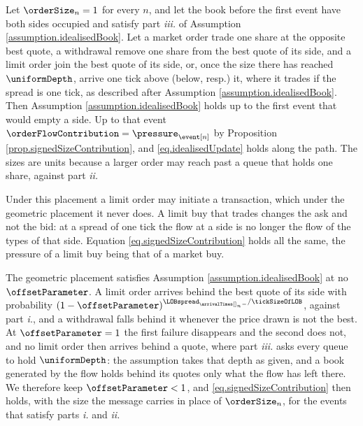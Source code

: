 \begin{example}
\label{example.idealisedPlacement}
 Let $\orderSize_n = 1$ for every $n$,
 and let the book before the first event have both sides occupied and satisfy part
 \emph{iii.} of Assumption \ref{assumption.idealisedBook}.
 Let a market order trade one share at the opposite best quote,
 a withdrawal remove one share from the best quote of its side,
 and a limit order join the best quote of its side,
 or, once the size there has reached $\uniformDepth$,
 arrive one tick above (below, resp.) it,
 where it trades if the spread is one tick,
 as described after Assumption \ref{assumption.idealisedBook}.
 Then Assumption \ref{assumption.idealisedBook} holds
 up to the first event that would empty a side.
 Up to that event $\orderFlowContribution = \pressure_{\event[n]}$
 by Proposition \ref{prop.signedSizeContribution},
 and \eqref{eq.idealisedUpdate} holds along the path.
 The sizes are units because a larger order may reach past a queue that holds one share,
 against part \emph{ii.}
\end{example}

Under this placement a limit order may initiate a transaction,
which under the geometric placement it never does.
A limit buy that trades changes the ask and not the bid:
at a spread of one tick the flow at a side is no longer the flow of the types of that side.
Equation \eqref{eq.signedSizeContribution} holds all the same,
the pressure of a limit buy being that of a market buy.

\begin{remark}\label{remark.depthBehindTheQuotes}
 The geometric placement satisfies Assumption \ref{assumption.idealisedBook}
 at no $\offsetParameter$.
 A limit order arrives behind the best quote of its side with probability
 $(1-\offsetParameter)^{\LOBspread_{\arrivalTimes[]_n-}/\tickSizeOfLOB}$,
 against part \emph{i.},
 and a withdrawal falls behind it whenever the price drawn is not the best.
 At $\offsetParameter = 1$ the first failure disappears and the second does not,
 and no limit order then arrives behind a quote,
 where part \emph{iii.} asks every queue to hold $\uniformDepth$:
 the assumption takes that depth as given,
 and a book generated by the flow holds behind its quotes only what the flow has left
 there.
 We therefore keep $\offsetParameter < 1$,
 and \eqref{eq.signedSizeContribution} then holds,
 with the size the message carries in place of $\orderSize_n$,
 for the events that satisfy parts \emph{i.} and \emph{ii.}
\end{remark}

